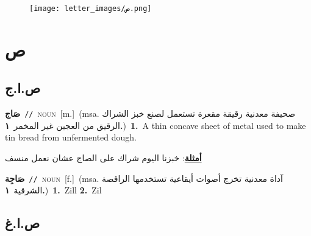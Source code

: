 \documentclass[10pt,a4paper,twoside]{article} %
\begin{document}
\begin{figure*}[t!]\centering\texttt{[image: letter\_images/ص.png]}\end{figure*}
\color{white}

 \section*{\foreignlanguage{arabic}{ص}} 
 \begin{multicols}{2} 

%
\color{black}
\vspace{-3mm}
\subsection*{\color{blue}\foreignlanguage{arabic}{ص.ا.ج}\color{blue}{ (ntws)}} 

{\setlength\topsep{0pt}\textbf{\foreignlanguage{arabic}{صَاج}}\ {\color{gray}\texttt{//}\color{black}}\ \textsc{noun}\ [m.]\ \color{gray}(msa. \foreignlanguage{arabic}{صحيفة معدنية رقيقة مقعرة تستعمل لصنع خبز الشراك الرقيق من العجين غير المخمر}~\foreignlanguage{arabic}{\textbf{١.}})\color{black}\ \textbf{1.}~A thin concave sheet of metal used to make tin bread from unfermented dough.\  \begin{flushright}\color{gray}\foreignlanguage{arabic}{\textbf{\underline{\foreignlanguage{arabic}{أمثلة}}}: خبزنا اليوم شراك على الصاج عشان نعمل منسف}\end{flushright}\color{black}} \vspace{2mm}

{\setlength\topsep{0pt}\textbf{\foreignlanguage{arabic}{صَاجِة}}\ {\color{gray}\texttt{//}\color{black}}\ \textsc{noun}\ [f.]\ \color{gray}(msa. \foreignlanguage{arabic}{آداة معدنية تخرج أصوات أيقاعية تستخدمها الراقصة الشرقية}~\foreignlanguage{arabic}{\textbf{١.}})\color{black}\ \textbf{1.}~Zill  \textbf{2.}~Zil\ } \vspace{2mm}

\vspace{-3mm}
\subsection*{\color{blue}\foreignlanguage{arabic}{ص.ا.غ}\color{blue}{ (ntws)}} 


\end{multicols}
\end{document}
